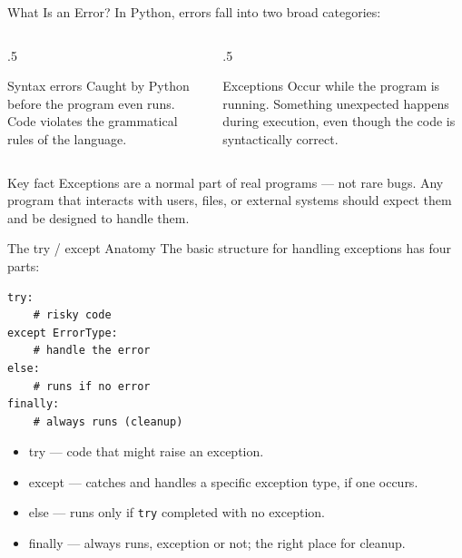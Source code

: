 \documentclass[9pt,aspectratio=169,xcolor=table]{beamer}
\begin{document}
\begin{frame}{What Is an Error?}
    \leavevmode
    In Python, errors fall into two broad categories:

    \vspace{3mm}
    \begin{columns}[t]
        \begin{column}{.5\textwidth}
            \begin{block}{Syntax errors}
                \small Caught by Python \alert{before} the program even
                runs. Code violates the grammatical rules of the
                language.
            \end{block}
        \end{column}
        \begin{column}{.5\textwidth}
            \begin{block}{Exceptions}
                \small Occur \alert{while} the program is running.
                Something unexpected happens during execution, even
                though the code is syntactically correct.
            \end{block}
        \end{column}
    \end{columns}

    \vspace{4mm}
    \begin{alertblock}{Key fact}
        Exceptions are a \alert{normal} part of real programs --- not
        rare bugs. Any program that interacts with users, files, or
        external systems should expect them and be designed to handle
        them.
    \end{alertblock}
\end{frame}

\begin{frame}[fragile]{The try / except Anatomy}
    \leavevmode
    The basic structure for handling exceptions has four parts:

\begin{lstlisting}
try:
    # risky code
except ErrorType:
    # handle the error
else:
    # runs if no error
finally:
    # always runs (cleanup)
\end{lstlisting}

    \vspace{1mm}
    \begin{itemize}\small
        \item \alert{try} --- code that might raise an exception.
        \item \alert{except} --- catches and handles a specific
              exception type, if one occurs.
        \item \alert{else} --- runs only if \texttt{try} completed with
              no exception.
        \item \alert{finally} --- always runs, exception or not; the
              right place for cleanup.
    \end{itemize}
\end{frame}
\end{document}
